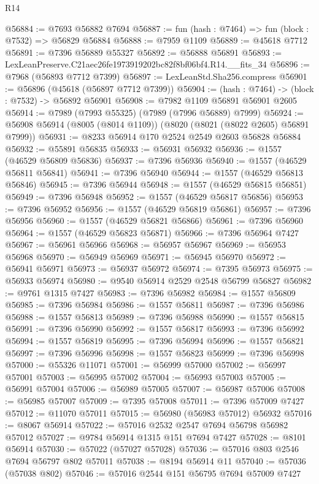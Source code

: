 \begin{lexlean}{R14}
\begin{coremodule}
@56884 := @7693 @56882 @7694
@56887 := fun (hash : @7464) => fun (block : @7532) => @56829 @56884
@56888 := @7959 @1109
@56889 := @45618 @7712
@56891 := @7396 @56889 @55327
@56892 := @56888 @56891
@56893 := LexLeanPreserve.C21aec26fe1973919202bc82f8bf06bf4.R14.__fits_34
@56896 := @7968 (@56893 @7712 @7399)
@56897 := LexLeanStd.Sha256.compress
@56901 := @56896 (@45618 (@56897 @7712 @7399))
@56904 := (hash : @7464) -> (block : @7532) -> @56892 @56901
@56908 := @7982 @1109 @56891 @56901 @2605
@56914 := @7989 (@7993 @55325) (@7989 (@7996 @56889) @7999)
@56924 := @56908 @56914 (@8005 (@8014 @1109)) (@8020 (@8021 (@8022 @2605) @56891 @7999))
@56931 := @8233 @56914 @170 @2524 @2549 @2603 @56828 @56884
@56932 := @55891 @56835
@56933 := @56931 @56932
@56936 := @1557 (@46529 @56809 @56836)
@56937 := @7396 @56936
@56940 := @1557 (@46529 @56811 @56841)
@56941 := @7396 @56940
@56944 := @1557 (@46529 @56813 @56846)
@56945 := @7396 @56944
@56948 := @1557 (@46529 @56815 @56851)
@56949 := @7396 @56948
@56952 := @1557 (@46529 @56817 @56856)
@56953 := @7396 @56952
@56956 := @1557 (@46529 @56819 @56861)
@56957 := @7396 @56956
@56960 := @1557 (@46529 @56821 @56866)
@56961 := @7396 @56960
@56964 := @1557 (@46529 @56823 @56871)
@56966 := @7396 @56964 @7427
@56967 := @56961 @56966
@56968 := @56957 @56967
@56969 := @56953 @56968
@56970 := @56949 @56969
@56971 := @56945 @56970
@56972 := @56941 @56971
@56973 := @56937 @56972
@56974 := @7395 @56973
@56975 := @56933 @56974
@56980 := @9540 @56914 @2529 @2548 @56799 @56827
@56982 := @9761 @1315 @7427
@56983 := @7396 @56982
@56984 := @1557 @56809
@56985 := @7396 @56984
@56986 := @1557 @56811
@56987 := @7396 @56986
@56988 := @1557 @56813
@56989 := @7396 @56988
@56990 := @1557 @56815
@56991 := @7396 @56990
@56992 := @1557 @56817
@56993 := @7396 @56992
@56994 := @1557 @56819
@56995 := @7396 @56994
@56996 := @1557 @56821
@56997 := @7396 @56996
@56998 := @1557 @56823
@56999 := @7396 @56998
@57000 := @55326 @11071
@57001 := @56999 @57000
@57002 := @56997 @57001
@57003 := @56995 @57002
@57004 := @56993 @57003
@57005 := @56991 @57004
@57006 := @56989 @57005
@57007 := @56987 @57006
@57008 := @56985 @57007
@57009 := @7395 @57008
@57011 := @7396 @57009 @7427
@57012 := @11070 @57011
@57015 := @56980 (@56983 @57012) @56932
@57016 := @8067 @56914
@57022 := @57016 @2532 @2547 @7694 @56798 @56982 @57012
@57027 := @9784 @56914 @1315 @151 @7694 @7427
@57028 := @8101 @56914
@57030 := @57022 (@57027 @57028)
@57036 := @57016 @803 @2546 @7694 @56797 @802 @57011
@57038 := @8194 @56914 @11
@57040 := @57036 (@57038 @802)
@57046 := @57016 @2544 @151 @56795 @7694 @57009 @7427

\end{coremodule}
\end{lexlean}
